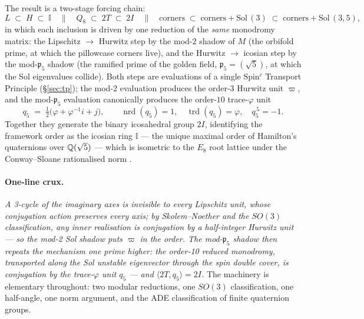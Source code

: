 \documentclass[11pt,a4paper]{article}
\theoremstyle{plain}
\theoremstyle{definition}
\theoremstyle{remark}
\newcommand{\Ico}{\mathbb{I}}
\newcommand{\pfive}{\mathfrak{p}_5}
\DeclareMathOperator{\trd}{trd}
\DeclareMathOperator{\nrd}{nrd}
\begin{document}
The result is a two-stage forcing chain:
\begin{equation}\label{eq:chain}
L \;\subset\; H \;\subset\; \Ico
\quad\Big\|\quad
Q_8 \;\subset\; 2T \;\subset\; 2I
\quad\Big\|\quad
\text{corners} \;\subset\; \text{corners} + \mathrm{Sol}\,(3) \;\subset\; \text{corners} + \mathrm{Sol}\,(3,5),
\end{equation}
in which each inclusion is driven by one reduction of the \emph{same} monodromy matrix: the Lipschitz $\to$ Hurwitz step by the mod-$2$ shadow of $M$ (the orbifold prime, at which the pillowcase corners live), and the Hurwitz $\to$ icosian step by the mod-$\pfive$ shadow (the ramified prime of the golden field, $\pfive = (\sqrt5)$, at which the Sol eigenvalues collide). Both steps are evaluations of a single Spin$^c$ Transport Principle (\S\ref{sec:tp}); the mod-$2$ evaluation produces the order-$3$ Hurwitz unit $\varpi$, and the mod-$\pfive$ evaluation canonically produces the order-$10$ trace-$\varphi$ unit
\begin{equation}\label{eq:q5}
q_5 \;=\; \tfrac12\big(\varphi + \varphi^{-1} i + j\big), \qquad
\nrd(q_5) = 1, \quad \trd(q_5) = \varphi, \quad q_5^{\,5} = -1 .
\end{equation}
Together they generate the binary icosahedral group $2I$, identifying the framework order as the icosian ring $\Ico$ --- the unique maximal order of Hamilton's quaternions over $\mathbb{Q}(\sqrt5)$ --- which is isometric to the $E_8$ root lattice under the Conway--Sloane rationalised norm \cite{ConwaySloane, Tits}.

\paragraph{One-line crux.}
\emph{A 3-cycle of the imaginary axes is invisible to every Lipschitz unit, whose conjugation action preserves every axis; by Skolem--Noether and the $SO(3)$ classification, any inner realisation is conjugation by a half-integer Hurwitz unit --- so the mod-2 Sol shadow puts $\varpi$ in the order. The mod-$\pfive$ shadow then repeats the mechanism one prime higher: the order-10 reduced monodromy, transported along the Sol unstable eigenvector through the spin double cover, is conjugation by the trace-$\varphi$ unit $q_5$ --- and $\langle 2T, q_5 \rangle = 2I$.}
The machinery is elementary throughout: two modular reductions, one $SO(3)$ classification, one half-angle, one norm argument, and the ADE classification of finite quaternion groups.
\end{document}
